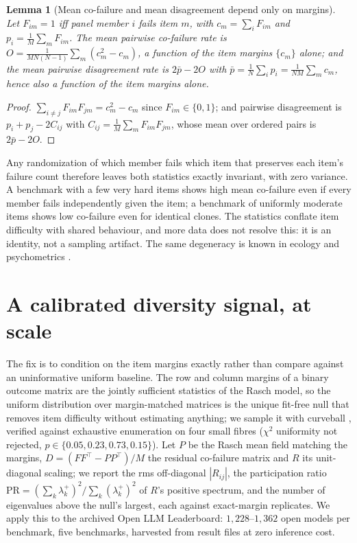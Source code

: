 \documentclass{article}
\newtheorem{lemma}{Lemma}
\begin{document}
\begin{lemma}[Mean co-failure and mean disagreement depend only on margins]
\label{lem:mean}
Let $F_{im}=1$ iff panel member $i$ fails item $m$, with $c_m=\sum_i F_{im}$ and
$p_i=\frac1M\sum_m F_{im}$. The mean pairwise co-failure rate is
$O=\frac{1}{MN(N-1)}\sum_m(c_m^2-c_m)$, a function of the item margins $\{c_m\}$ alone; and the
mean pairwise disagreement rate is $2\bar p-2O$ with $\bar p=\frac1N\sum_i p_i=\frac{1}{NM}\sum_m c_m$,
hence also a function of the item margins alone.
\end{lemma}
\begin{proof}
$\sum_{i\neq j}F_{im}F_{jm}=c_m^2-c_m$ since $F_{im}\in\{0,1\}$; and pairwise disagreement is
$p_i+p_j-2C_{ij}$ with $C_{ij}=\frac1M\sum_m F_{im}F_{jm}$, whose mean over ordered pairs is
$2\bar p-2O$.
\end{proof}
\noindent Any randomization of which member fails which item that preserves each item's failure
count therefore leaves both statistics exactly invariant, with zero variance. A benchmark with a few
very hard items shows high mean co-failure even if every member fails independently given the
item; a benchmark of uniformly moderate items shows low co-failure even for identical clones. The
statistics conflate item difficulty with shared behaviour, and more data does not resolve this: it
is an identity, not a sampling artifact. The same degeneracy is known in ecology
\citep{schluter1984,gotelli2000} and psychometrics \citep{cronbach1951}.

\section{A calibrated diversity signal, at scale}

The fix is to condition on the item margins exactly rather than compare against an uninformative
uniform baseline. The row and column margins of a binary outcome matrix are the jointly
sufficient statistics of the Rasch model, so the uniform distribution over margin-matched matrices
is the unique fit-free null that removes item difficulty without estimating anything; we sample it
with curveball \citep{strona2014}, verified against exhaustive enumeration on four small fibres
($\chi^2$ uniformity not rejected, $p\in\{0.05,0.23,0.73,0.15\}$). Let $P$ be the Rasch mean field
matching the margins, $D=(FF^{\!\top}-PP^{\!\top})/M$ the residual co-failure matrix and $R$ its
unit-diagonal scaling; we report the rms off-diagonal $|R_{ij}|$, the participation ratio
$\mathrm{PR}=(\sum_k\lambda_k^+)^2/\sum_k(\lambda_k^+)^2$ of $R$'s positive spectrum, and the
number of eigenvalues above the null's largest, each against exact-margin replicates. We apply this
to the archived Open LLM Leaderboard: $1{,}228$--$1{,}362$ open models per benchmark, five
benchmarks, harvested from result files at zero inference cost.
\end{document}
